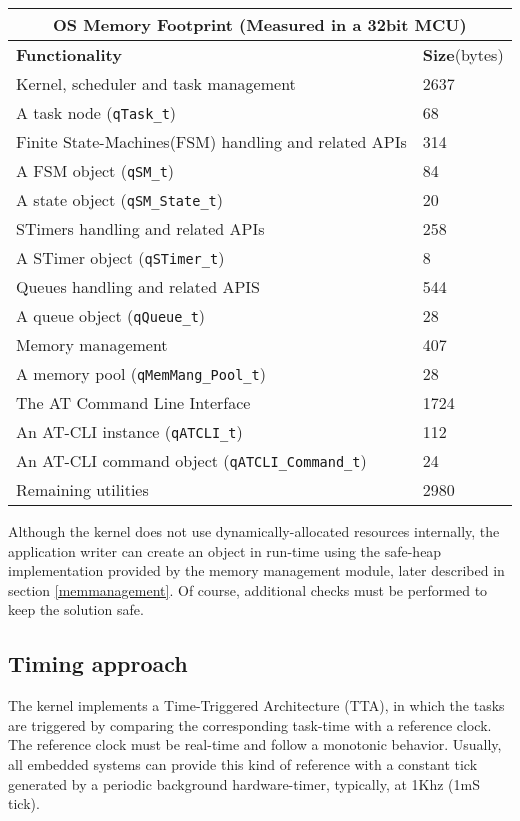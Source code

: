\begin{center}
\begin{tabular}{ |p{10cm}||p{1.5cm}|  }
    \hline
    \multicolumn{2}{|c|}{ \textbf{OS Memory Footprint} \scriptsize{(Measured in a 32bit MCU)}} \\
    \hline
    \textbf{Functionality} & \textbf{Size}\scriptsize{(bytes)}\\
    \hline
    Kernel, scheduler and task management& 2637\\
    A task node ({\lstinline!qTask_t!}) & 68\\
    Finite State-Machines(FSM) handling and related APIs& 314\\
    A FSM object ({\lstinline!qSM_t!}) & 84 \\
    A state object ({\lstinline!qSM_State_t!}) & 20 \\    
    STimers handling and related APIs & 258\\
    A STimer object ({\lstinline!qSTimer_t!})& 8\\
    Queues handling and related APIS & 544\\
    A queue object ({\lstinline!qQueue_t!}) & 28\\
    Memory management & 407\\
    A memory pool ({\lstinline!qMemMang_Pool_t!}) & 28 \\ 
    The AT Command Line Interface & 1724\\
    An AT-CLI instance ({\lstinline!qATCLI_t!})& 112\\
    An AT-CLI command object ({\lstinline!qATCLI_Command_t!})& 24\\
    Remaining utilities& 2980\\
    \hline
\end{tabular}
\end{center}

 \begin{tcolorbox}
 \HandRight Although the kernel does not use dynamically-allocated resources internally, the application writer can create an object in run-time using the safe-heap implementation provided by the memory management module, later described in section \ref{memmanagement}. Of course, additional checks must be performed to keep the solution safe.
 \end{tcolorbox}

\subsection{Timing approach}
The kernel implements a Time-Triggered Architecture (TTA)\cite{pont}, in which the tasks are triggered by comparing the corresponding task-time with a reference clock. The reference clock must be real-time and follow a monotonic behavior. Usually, all embedded systems can provide this kind of reference with a constant tick generated by a periodic background hardware-timer, typically, at 1Khz (1mS tick). 

